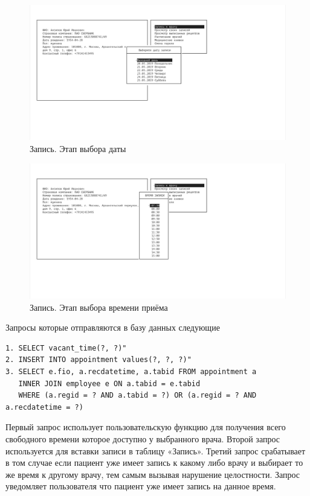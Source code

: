 \documentclass[14pt,a4paper,russian]{extreport}
\begin{document}
\begin{figure}[h!]
        \includegraphics[width=\textwidth]{prog_int/appointment2}
        \caption{Запись. Этап выбора даты}
        \label{fig:appointment2}
\end{figure}
\begin{figure}[h!]
        \includegraphics[width=\textwidth]{prog_int/appointment3}
        \caption{Запись. Этап выбора времени приёма}
        \label{fig:appointment3}
\end{figure}
Запросы которые отправляются в базу данных следующие 
\begin{lstlisting}[style=csql] 
1. SELECT vacant_time(?, ?)"
2. INSERT INTO appointment values(?, ?, ?)"
3. SELECT e.fio, a.recdatetime, a.tabid FROM appointment a 
   INNER JOIN employee e ON a.tabid = e.tabid 
   WHERE (a.regid = ? AND a.tabid = ?) OR (a.regid = ? AND a.recdatetime = ?)
\end{lstlisting}
Первый запрос использует пользовательскую функцию для получения всего свободного времени которое доступно у выбранного врача.
Второй запрос используется для вставки записи в таблицу «Запись».
Третий запрос срабатывает в том случае если пациент уже имеет запись к какому либо врачу и выбирает то же время к другому врачу, тем самым вызывая нарушение целостности. Запрос уведомляет пользователя что пациент уже имеет запись на данное время.
\end{document}
